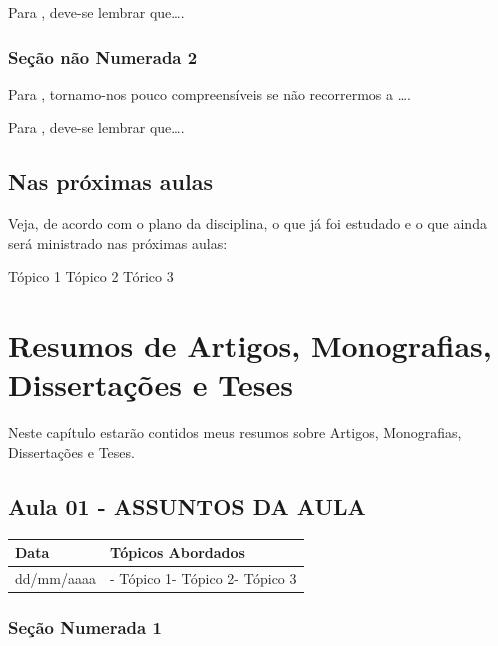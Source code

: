 \documentclass[
]{book}
\begin{document}
Para \citet{DAVIDOFF2001}, deve-se lembrar que\ldots.

\hypertarget{seuxe7uxe3o-nuxe3o-numerada-2-62}{%
\subsection*{Seção não Numerada 2}\label{seuxe7uxe3o-nuxe3o-numerada-2-62}}

Para \citet{BOCK2001}, tornamo-nos pouco compreensíveis se não recorrermos a \ldots.

Para \citet{DAVIDOFF2001}, deve-se lembrar que\ldots.

\hypertarget{nas-pruxf3ximas-aulas-8}{%
\section{Nas próximas aulas}\label{nas-pruxf3ximas-aulas-8}}

Veja, de acordo com o plano da disciplina, o que já foi estudado e o que ainda será ministrado nas próximas aulas:

Tópico 1
Tópico 2
Tórico 3

\hypertarget{resumos-de-artigos-monografias-dissertauxe7uxf5es-e-teses-1}{%
\chapter{Resumos de Artigos, Monografias, Dissertações e Teses}\label{resumos-de-artigos-monografias-dissertauxe7uxf5es-e-teses-1}}

Neste capítulo estarão contidos meus resumos sobre Artigos, Monografias, Dissertações e Teses.

\hypertarget{aula-01---assuntos-da-aula-5}{%
\section{Aula 01 - ASSUNTOS DA AULA}\label{aula-01---assuntos-da-aula-5}}

\begin{longtable}[]{@{}ll@{}}
\toprule()
Data & Tópicos Abordados \\
\midrule()
\endhead
dd/mm/aaaa & - Tópico 1- Tópico 2- Tópico 3 \\
\bottomrule()
\end{longtable}

\hypertarget{seuxe7uxe3o-numerada-1-21}{%
\subsection{Seção Numerada 1}\label{seuxe7uxe3o-numerada-1-21}}
\end{document}
